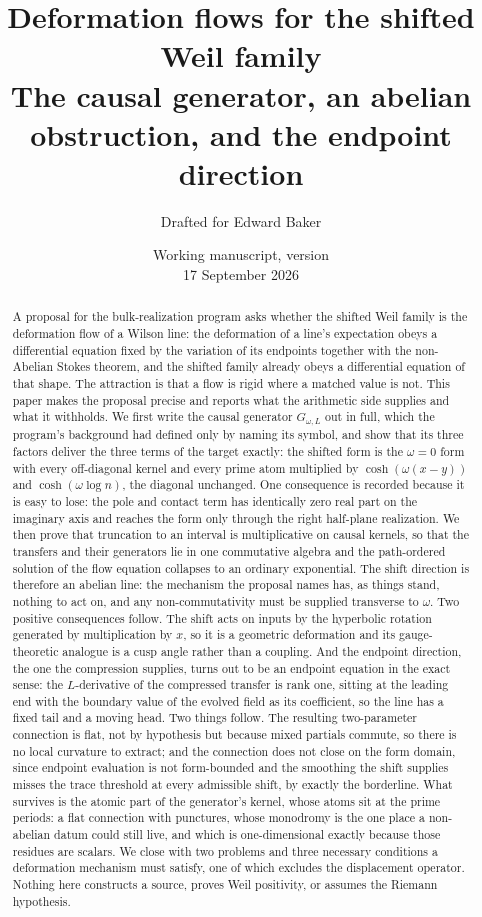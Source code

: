 \documentclass[11pt]{article}
\title{Deformation flows for the shifted Weil family\\[5pt]
\large The causal generator, an abelian obstruction, and the endpoint direction}
\author{Drafted for Edward Baker}
\date{Working manuscript, version \draftversion\\17 September 2026}
\numberwithin{equation}{section}
\theoremstyle{definition}
\theoremstyle{remark}
\begin{document}
\maketitle
\begin{abstract}
A proposal for the bulk-realization program asks whether the shifted Weil family
is the deformation flow of a Wilson line: the deformation of a line's expectation
obeys a differential equation fixed by the variation of its endpoints together
with the non-Abelian Stokes theorem, and the shifted family already obeys a
differential equation of that shape. The attraction is that a flow is rigid where
a matched value is not. This paper makes the proposal precise and reports what
the arithmetic side supplies and what it withholds. We first write the causal
generator $G_{\omega,L}$ out in full, which the program's background had defined
only by naming its symbol, and show that its three factors deliver the three
terms of the target exactly: the shifted form is the $\omega=0$ form with every
off-diagonal kernel and every prime atom multiplied by $\cosh(\omega(x-y))$ and
$\cosh(\omega\log n)$, the diagonal unchanged. One consequence is recorded because
it is easy to lose: the pole and contact term has identically zero real part on
the imaginary axis and reaches the form only through the right half-plane
realization. We then prove that truncation to an interval is multiplicative on
causal kernels, so that the transfers and their generators lie in one commutative
algebra and the path-ordered solution of the flow equation collapses to an
ordinary exponential. The shift direction is therefore an abelian line: the
mechanism the proposal names has, as things stand, nothing to act on, and any
non-commutativity must be supplied transverse to $\omega$. Two positive
consequences follow. The shift acts on inputs by the hyperbolic rotation
generated by multiplication by $x$, so it is a geometric deformation and its
gauge-theoretic analogue is a cusp angle rather than a coupling. And the endpoint
direction, the one the compression supplies, turns out to be an endpoint equation
in the exact sense: the $L$-derivative of the compressed transfer is rank one,
sitting at the leading end with the boundary value of the evolved field as its
coefficient, so the line has a fixed tail and a moving head. Two things follow.
The resulting two-parameter connection is flat, not by hypothesis but because
mixed partials commute, so there is no local curvature to extract; and the
connection does not close on the form domain, since endpoint evaluation is not
form-bounded and the smoothing the shift supplies misses the trace threshold at
every admissible shift, by exactly the borderline. What survives is the atomic
part of the generator's kernel, whose atoms sit at the prime periods: a flat
connection with punctures, whose monodromy is the one place a non-abelian datum
could still live, and which is one-dimensional exactly because those residues are
scalars. We close with two problems and three necessary conditions a deformation
mechanism must satisfy, one of which excludes the displacement operator. Nothing
here constructs a source, proves Weil positivity, or assumes the Riemann
hypothesis.
\end{abstract}
\end{document}
